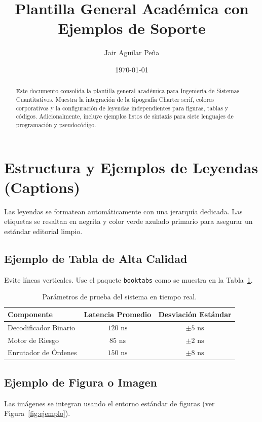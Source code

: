 \documentclass[11pt, a4paper]{article}
\title{\textbf{\color{primary}Plantilla General Académica con Ejemplos de Soporte}}
\author{Jair Aguilar Peña}
\date{\today}
\begin{document}
\maketitle

\begin{abstract}
Este documento consolida la plantilla general académica para Ingeniería de Sistemas Cuantitativos. Muestra la integración de la tipografía Charter serif, colores corporativos y la configuración de leyendas independientes para figuras, tablas y códigos. Adicionalmente, incluye ejemplos listos de sintaxis para siete lenguajes de programación y pseudocódigo.
\end{abstract}

\tableofcontents
\newpage

\section{Estructura y Ejemplos de Leyendas (Captions)}

Las leyendas se formatean automáticamente con una jerarquía dedicada. Las etiquetas se resaltan en negrita y color verde azulado primario para asegurar un estándar editorial limpio.

\subsection{Ejemplo de Tabla de Alta Calidad}
Evite líneas verticales. Use el paquete \texttt{booktabs} como se muestra en la Tabla~\ref{tab:parametros}.

\begin{table}[h]
\centering
\caption{Parámetros de prueba del sistema en tiempo real.}
\label{tab:parametros}
\begin{tabular}{lcc}
    \toprule
    \textbf{Componente} & \textbf{Latencia Promedio} & \textbf{Desviación Estándar} \\
    \midrule
    Decodificador Binario & $120\text{ ns}$ & $\pm 5\text{ ns}$ \\
    Motor de Riesgo & $85\text{ ns}$ & $\pm 2\text{ ns}$ \\
    Enrutador de Órdenes & $150\text{ ns}$ & $\pm 8\text{ ns}$ \\
    \bottomrule
\end{tabular}
\end{table}

\subsection{Ejemplo de Figura o Imagen}
Las imágenes se integran usando el entorno estándar de figuras (ver Figura~\ref{fig:ejemplo}).
\end{document}
